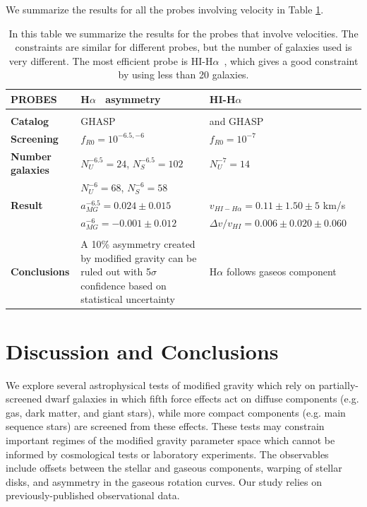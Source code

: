 \documentclass[useAMS,usenatbib,twocolumn]{mn2e}
\newcommand{\ha}{H$\alpha$}
\begin{document}
We summarize the results for all the probes involving velocity in Table
\ref{tablefinal}.


\begin{table}
\begin{tabular}{ || l | p{4cm} | p{4cm} | p{4cm} ||}
        \hline
{\bf PROBES} &  {\bf \ha~ asymmetry}    &  {\bf HI-H$\alpha$}    \\
        \hline
\\
{\bf Catalog}   & GHASP  & \citet{Swaters2009} and GHASP  
\\
{\bf Screening}   & $f_{R0}=10^{-6.5, -6}$  & $f_{R0}=10^{-7}$  
\\
{\bf Number galaxies}   & $N_U^{-6.5}=24$, $N_S^{-6.5}=102$  & $N_U^{-7}=14$ 
\\

   & $N_U^{-6}=68$, $N_S^{-6}=58$  &  
\\

  
{\bf Result}   & $a_{MG}^{-6.5}=0.024\pm 0.015$   & 
 $v_{HI-H\alpha}= 0.11\pm 1.50 \pm 5$ km/s \\
   &  $a_{MG}^{-6}=-0.001\pm 0.012$ & 
$\Delta v/v_{HI}= 0.006\pm 0.020 \pm 0.060$  \\
   \\
{\bf Conclusions}   & A 10\% asymmetry created by modified gravity can be
ruled out with 5$\sigma$ confidence based on statistical uncertainty & \ha{}
follows gaseos component \\
\hline
\end{tabular}
\caption{In this table we summarize the results for the probes that involve
velocities. The constraints are similar for different probes, but the number of
galaxies used is very different. The most efficient probe is HI-\ha~,
which gives a good constraint by using less than 20 galaxies.
\label{tablefinal}}
\end{table}



\section{Discussion and Conclusions}

\label{sec:discussion}
We explore several astrophysical tests of modified gravity which rely on
partially-screened dwarf galaxies in which fifth force effects act on
diffuse components (e.g. gas, dark matter, and giant stars), while more
compact components (e.g. main sequence stars) are screened from these effects.
These tests may constrain important regimes of the modified gravity
parameter space which cannot be informed by cosmological tests or
laboratory experiments.  The observables include offsets between the stellar
and gaseous components, warping of stellar disks, and asymmetry in the
gaseous rotation curves. Our study relies on previously-published
observational data.
\end{document}
